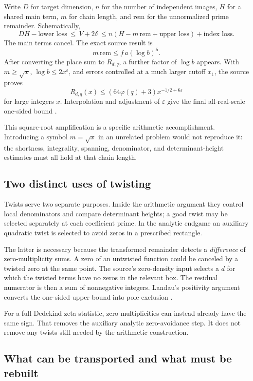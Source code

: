 Write $D$ for target dimension, $n$ for the number of independent images,
$H$ for a shared main term, $m$ for chain length, and $\mathrm{rem}$
for the unnormalized prime remainder. Schematically,
\[
 DH-\text{lower loss}
 \ \le\ V+2\delta\
 \le n(H-m\,\mathrm{rem}+\text{upper loss})
       +\text{index loss}.
\]
The main terms cancel. The exact source result is
\[
 m\,\mathrm{rem}\le f\,a(\log b)^5.
\]
After converting the place sum to $R_{d,q}$, a further factor of
$\log b$ appears. With $m\ge\sqrt x$, $\log b\le2x^\varepsilon$,
and errors controlled at a much larger cutoff $x_1$, the source proves
\[
 R_{d,q}(x)\le(64\varphi(q)+3)x^{-1/2+6\varepsilon}
\]
for large integers $x$. Interpolation and adjustment of $\varepsilon$
give the final all-real-scale one-sided bound
\cite{mainineq,onesided}.

This square-root amplification is a specific arithmetic accomplishment.
Introducing a symbol $m=\sqrt x$ in an unrelated problem would not
reproduce it: the shortness, integrality, spanning, denominator, and
determinant-height estimates must all hold at that chain length.

\subsection{Two distinct uses of twisting}

Twists serve two separate purposes. Inside the arithmetic argument they
control local denominators and compare determinant heights; a good
twist may be selected separately at each coefficient prime. In the
analytic endgame an auxiliary quadratic twist is selected to avoid
zeros in a prescribed rectangle.

The latter is necessary because the transformed remainder detects a
\emph{difference} of zero-multiplicity sums. A zero of an untwisted
function could be canceled by a twisted zero at the same point.
The source's zero-density input selects a $d$ for which the twisted
terms have no zeros in the relevant box. The residual numerator is
then a sum of nonnegative integers. Landau's positivity argument
converts the one-sided upper bound into pole exclusion
\cite{criterion}.

For a full Dedekind-zeta statistic, zero multiplicities can instead
already have the same sign. That removes the auxiliary analytic
zero-avoidance step. It does not remove any twists still needed by
the arithmetic construction.

\subsection{What can be transported and what must be rebuilt}

